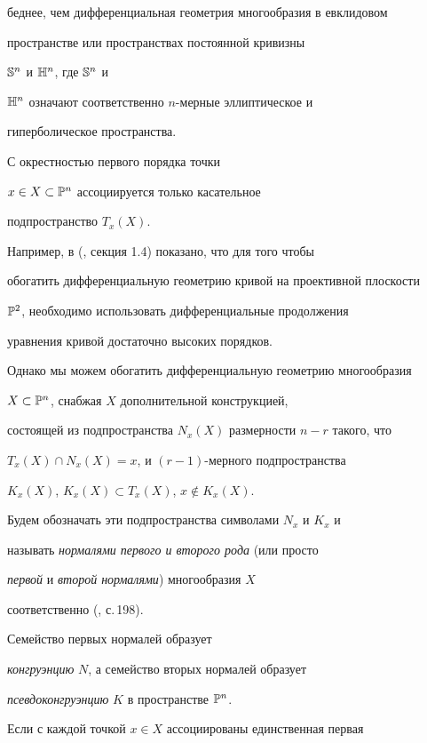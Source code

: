 беднее, чем дифференциальная геометрия многообразия в евклидовом


пространстве или пространствах постоянной кривизны


$\Bbb{S}^n$ и $\Bbb{H}^n$, где $\Bbb{S}^n$ и


$\Bbb{H}^n$ означают соответственно $n$-мерные эллиптическое и


гиперболическое пространства.


 С окрестностью первого порядка точки


$x \in X \subset \Bbb{P}^n$ ассоциируется только касательное


подпространство $T_x (X)$.


Например, в (\cite{AG04}, секция 1.4)  показано, что для того чтобы


обогатить дифференциальную геометрию кривой на проективной плоскости


$\Bbb{P}^2$, необходимо использовать дифференциальные продолжения


уравнения кривой достаточно высоких порядков.





Однако мы можем обогатить дифференциальную геометрию многообразия


$X\subset\Bbb{P}^n$, снабжая $X$ дополнительной конструкцией,


состоящей из подпространства $N_x (X)$ размерности $n - r$ такого, что


$T_x (X) \cap N_x (X) = x$, и $(r - 1)$-мерного подпространства


$K_x (X)$, $K_x (X) \subset T_x (X)$, $x \notin K_x (X)$.


 Будем обозначать эти подпространства символами $N_x$ и $K_x$ и


называть {\it нормалями первого и второго рода} (или просто


{\it первой} и {\it второй нормалями}) многообразия $X$


соответственно (\cite{N76}, с.\,198).





Семейство первых нормалей образует


{\it конгруэнцию} $N$, а семейство вторых нормалей образует


{\it псевдоконгруэнцию} $K$ в пространстве $\Bbb{P}^n$.


Если с каждой точкой $x \in X$ ассоциированы единственная первая


